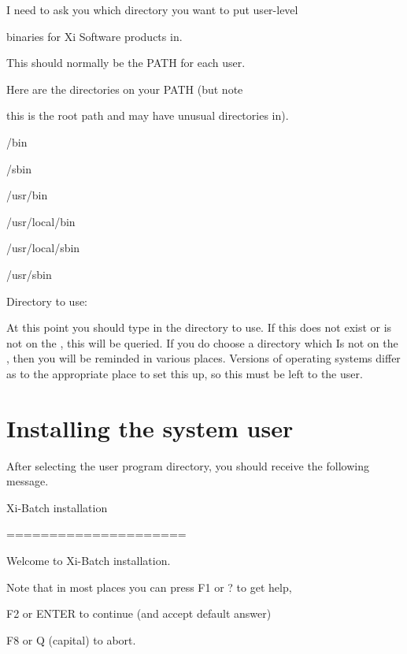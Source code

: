 {\begin{expara}
I need to ask you which directory you want to put user-level

binaries for Xi Software products in.

\bigskip

This should normally be the PATH for each user.

\bigskip

Here are the directories on your PATH (but note


this is the root path and may have unusual directories in).

\bigskip

/bin

/sbin

/usr/bin

/usr/local/bin

/usr/local/sbin

/usr/sbin

\bigskip

Directory to use:

\end{expara}

At this point you should type in the directory to use. If this does not
exist or is not on the , this will be queried.
If you do choose a directory which Is not on the
, then you will be reminded in various places.
Versions of operating systems differ as to the appropriate place to set
this up, so this must be left to the user.

\section{Installing the system user}
After selecting the user program directory, you should receive the
following message.

\begin{expara}

Xi-Batch installation

=====================

\bigskip

Welcome to Xi-Batch installation.

\bigskip

Note that in most places you can press F1 or ? to get help,

F2 or ENTER to continue (and accept default answer)

F8 or Q (capital) to abort.

\bigskip


\end{expara}}
